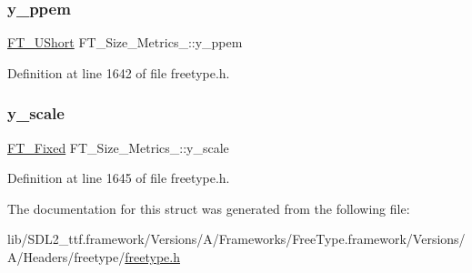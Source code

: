 \mbox{\label{struct_f_t___size___metrics___abcdb70cb9e39a74679bc39c07f3275f7}} 
\subsubsection{\texorpdfstring{y\_ppem}{y\_ppem}}
{\footnotesize\ttfamily \mbox{\hyperlink{fttypes_8h_a937f6c17cf5ffd09086d8610c37b9f58}{F\+T\+\_\+\+U\+Short}} F\+T\+\_\+\+Size\+\_\+\+Metrics\+\_\+\+::y\+\_\+ppem}



Definition at line 1642 of file freetype.\+h.

\mbox{\label{struct_f_t___size___metrics___a1f8b1cb3538b9920127f721dd061379d}} 
\subsubsection{\texorpdfstring{y\_scale}{y\_scale}}
{\footnotesize\ttfamily \mbox{\hyperlink{fttypes_8h_a5f5a679cc09f758efdd0d1c5feed3c3d}{F\+T\+\_\+\+Fixed}} F\+T\+\_\+\+Size\+\_\+\+Metrics\+\_\+\+::y\+\_\+scale}



Definition at line 1645 of file freetype.\+h.



The documentation for this struct was generated from the following file\+:\begin{DoxyCompactItemize}
\item 
lib/\+S\+D\+L2\+\_\+ttf.\+framework/\+Versions/\+A/\+Frameworks/\+Free\+Type.\+framework/\+Versions/\+A/\+Headers/freetype/\mbox{\hyperlink{freetype_8h}{freetype.\+h}}\end{DoxyCompactItemize}
